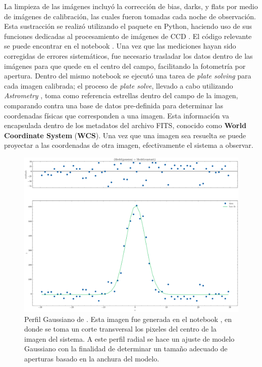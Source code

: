 La limpieza de las imágenes incluyó la corrección de bias, darks, y flats por
medio de imágenes de calibración, las cuales fueron tomadas cada noche de
observación. Esta sustracción se realizó utilizando el paquete  en
Python, haciendo uso de sus funciones dedicadas al procesamiento de imágenes de
CCD . El código relevante se puede encontrar en el notebook
\href{https://github.com/KnightIV/UANL_MAPTA_Observaciones/blob/main/analisis/iturbide/photometry_clean.ipynb}{}.
Una vez que las mediciones hayan sido corregidas de errores sistemáticos, fue
necesario trasladar los datos dentro de las imágenes para que \atoObjId quede en
el centro del campo, facilitando la fotometría por apertura. Dentro del mismo
notebook
\href{https://github.com/KnightIV/UANL_MAPTA_Observaciones/blob/main/analisis/iturbide/photometry_clean.ipynb}{}
se ejecutó una tarea de \textit{plate solving} para cada imagen calibrada; el
proceso de \textit{plate solve}, llevado a cabo utilizando \textit{Astrometry}
, toma como referencia estrellas dentro del campo de la
imagen, comparando contra una base de datos pre-definida para determinar las
coordenadas físicas que corresponden a una imagen. Esta información va
encapsulada dentro de los metadatos del archivo FITS, conocido como
\textbf{World Coordinate System} (\textbf{WCS}). Una vez que una imagen sea
resuelta se puede proyectar a las coordenadas de otra imagen, efectivamente
 el sistema a observar.

\begin{figure}[!ht]
	\centering
	\includegraphics[scale=0.44]{Observaciones/Secciones/Figures/Pixel Radial Profile - Gaussian.png}
	\caption{Perfil Gaussiano de \atoObjId. Esta imagen fue generada en el
	notebook
	\href{https://github.com/KnightIV/UANL_MAPTA_Observaciones/blob/main/analisis/iturbide/iraf/qphot_params_helper.ipynb}{},
	en donde se toma un corte transversal los pixeles del centro de la imagen
	del sistema. A este perfil radial se hace un ajuste de modelo Gaussiano con
	la finalidad de determinar un tamaño adecuado de aperturas basado en la
	anchura del modelo.}
	\label{pixelGaussProfile}
\end{figure}

